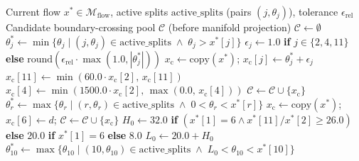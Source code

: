 \begin{algorithm}[!t]
\footnotesize\linespread{1}\selectfont
\caption{TSBS Candidate Generation ($\text{GenerateCandidates}$)}
\label{alg:tsbs_candidates}
\begin{algorithmic}[1]
\REQUIRE Current flow $x^* \in \mathcal{M}_{\text{flow}}$, active splits $\text{active\_splits}$ (pairs $(j, \theta_j)$), tolerance $\epsilon_{\text{rel}}$
\ENSURE Candidate boundary-crossing pool $\mathcal{C}$ (before manifold projection)
\STATE $\mathcal{C} \leftarrow \emptyset$
\STATE {}
    \STATE $\theta_j^* \leftarrow \min\{\theta_j \mid (j, \theta_j) \in \text{active\_splits} \;\land\; \theta_j > x^*[j]\}$
        \STATE $\epsilon_j \leftarrow 1.0$ \textbf{if} $j \in \{2, 4, 11\}$ \textbf{else} $\text{round}(\epsilon_{\text{rel}} \cdot \max(1.0, |\theta_j^*|))$
        \STATE $x_{\text{c}} \leftarrow \text{copy}(x^*)$; $x_{\text{c}}[j] \leftarrow \theta_j^* + \epsilon_j$
            \STATE $x_{\text{c}}[11] \leftarrow \min(60.0 \cdot x_{\text{c}}[2],\, x_{\text{c}}[11])$
            \STATE $x_{\text{c}}[4] \leftarrow \min(1500.0 \cdot x_{\text{c}}[2],\, \max(0.0,\, x_{\text{c}}[4]))$
        \ENDIF
        \STATE $\mathcal{C} \leftarrow \mathcal{C} \cup \{x_{\text{c}}\}$
    \ENDIF
\ENDFOR
\STATE {}
    \STATE $\theta_r^* \leftarrow \max\{\theta_r \mid (r, \theta_r) \in \text{active\_splits} \;\land\; 0 < \theta_r < x^*[r]\}$
        \STATE $x_{\text{c}} \leftarrow \text{copy}(x^*)$; $x_{\text{c}}[6] \leftarrow d$; $\mathcal{C} \leftarrow \mathcal{C} \cup \{x_{\text{c}}\}$
    \ENDIF
\ENDFOR
\STATE {}
\STATE $H_0 \leftarrow 32.0$ \textbf{if} $(x^*[1] = 6 \land x^*[11]/x^*[2] \ge 26.0)$ \textbf{else} $20.0$ \textbf{if} $x^*[1] = 6$ \textbf{else} $8.0$
\STATE $L_0 \leftarrow 20.0 + H_0$ 
\STATE $\theta_{10}^* \leftarrow \max\{\theta_{10} \mid (10, \theta_{10}) \in \text{active\_splits} \;\land\; L_0 < \theta_{10} < x^*[10]\}$

\end{algorithmic}
\end{algorithm}
